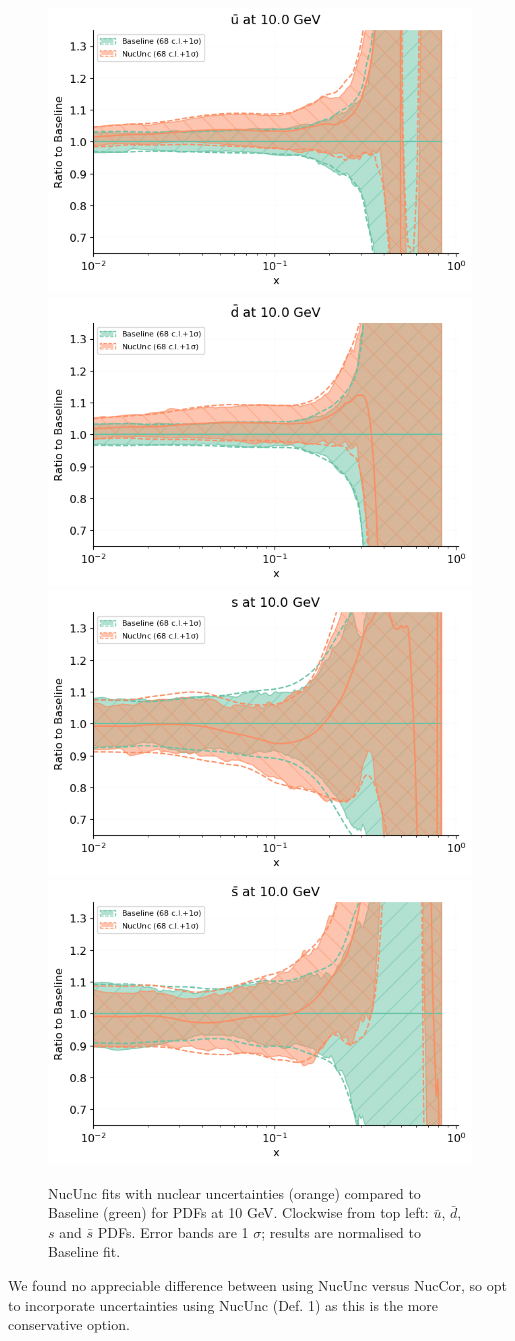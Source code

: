 \begin{figure}
  \centering
\includegraphics[width=0.45\linewidth]{nuclear/pdf_cv_nucldef1_baru.png}
\includegraphics[width=0.45\linewidth]{nuclear/pdf_cv_nucldef1_bard.png}
\newline
\includegraphics[width=0.45\linewidth]{nuclear/pdf_cv_nucldef1_s.png}
\includegraphics[width=0.45\linewidth]{nuclear/pdf_cv_nucldef1_bars.png}
    \caption{\footnotesize  NucUnc fits with nuclear uncertainties (orange) compared to Baseline (green) for PDFs at 10 GeV. Clockwise from top left: $\bar{u}$, $\bar{d}$, $s$ and $\bar{s}$ PDFs. Error bands are 1 $\sigma$; results are normalised to Baseline fit.  \label{fig:pdfs}}
\end{figure}
We found no appreciable difference between using NucUnc versus NucCor, so opt to incorporate uncertainties using NucUnc (Def. 1) as this is the more conservative option.

